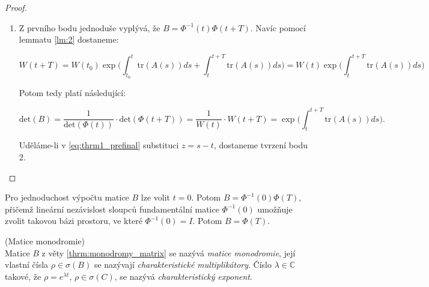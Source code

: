 \begin{thrm}
\begin{proof}
\begin{enumerate}
			\item Z prvního bodu jednoduše vyplývá, že $B = \Phi^{-1}(t) \Phi(t+T)$. Navíc pomocí lemmatu \ref{lm:2} dostaneme:
			
			\begin{equation}
				W(t+T) = W(t_{0}) \exp \Big( \int_{t_{0}}^{t} \mathrm{tr} (A(s)) ds +  \int_{t}^{t+T} \mathrm{tr} (A(s)) ds \Big) = W(t) \exp \Big( \int_{t}^{t+T} \mathrm{tr} (A(s)) ds \Big)
			\end{equation}
			
			Potom tedy platí následující: 
			
			\begin{equation}\label{eq:thrm1_prefinal}
				\mathrm{det} (B) = \frac{1}{ \mathrm{det} (\Phi(t)) } \cdot \mathrm{det} (\Phi(t+T)) = \frac{1}{W(t)} \cdot W(t+T) = \exp \Big( \int_{t}^{t+T} \mathrm{tr} (A(s)) ds \Big).
			\end{equation}
			
			Uděláme-li v \eqref{eq:thrm1_prefinal} substituci $ z = s - t $, dostaneme tvrzení bodu $2$.
		\end{enumerate}
	\end{proof}
\end{thrm}

\medskip

\begin{remark}\label{remark:monodromy_matrix_calculation}
	Pro jednoduchost výpočtu matice $B$ lze volit $t = 0$. Potom $B = \Phi^{-1}(0) \Phi(T)$, přičemž lineární nezávislost sloupců fundamentální matice $\Phi^{-1}(0)$ umožňuje zvolit takovou bázi prostoru, ve které $\Phi^{-1}(0) = I$. Potom $B = \Phi(T)$.
\end{remark}

\medskip

\begin{defn} (Matice monodromie) \\
	Matice $B$ z věty \ref{thrm:monodromy_matrix} se nazývá \textit{matice monodromie}, její vlastní čísla $\rho \in \sigma(B)$ se nazývají \textit{charakteristické multiplikátory}. Číslo $\lambda \in \mathbb{C}$ takové, že $\rho = e^{ \lambda t }$, $\rho \in \sigma(C)$, se nazývá \textit{charakteristický exponent}.
\end{defn}

\medskip

